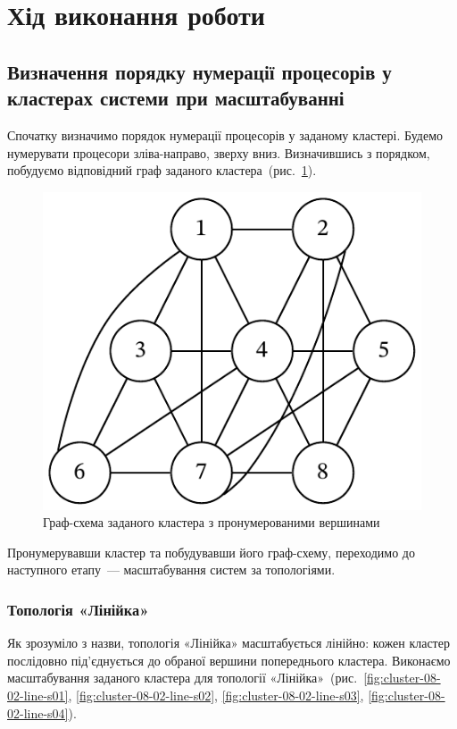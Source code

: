 \documentclass[
	a4paper,
	oneside,
	BCOR = 10mm,
	DIV = 12,
	12pt,
	headings = normal,
]{scrartcl}
\begin{document}
	\section{Хід виконання роботи}
		\subsection{Визначення порядку нумерації процесорів у кластерах системи при масштабуванні}
		\label{ssec:scaling}
			Спочатку визначимо порядок нумерації процесорів у заданому кластері. Будемо нумерувати процесори зліва-направо, зверху вниз. Визначившись з порядком, побудуємо відповідний граф заданого кластера~(рис.~\ref{fig:cluster-08-01-named}).

			\begin{figure}[!htbp]
				\centering
				\includegraphics[height=6\baselineskip]{./assets/cluster-08-01-named.pdf}
				\caption{Граф-схема заданого кластера з пронумерованими вершинами}
				\label{fig:cluster-08-01-named}
			\end{figure}

			Пронумерувавши кластер та побудувавши його граф-схему, переходимо до наступного етапу~— масштабування систем за топологіями.

			\subsubsection{Топологія «Лінійка»}
				Як зрозуміло з назви, топологія «Лінійка» масштабується лінійно: кожен кластер послідовно під'єднується до обраної вершини попереднього кластера. Виконаємо масштабування заданого кластера для топології «Лінійка»~(рис.~\ref{fig:cluster-08-02-line-s01}, \ref{fig:cluster-08-02-line-s02}, \ref{fig:cluster-08-02-line-s03}, \ref{fig:cluster-08-02-line-s04}).
\end{document}

